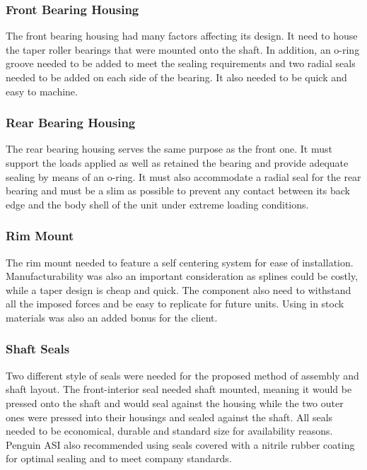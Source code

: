 \subsubsection{Front Bearing Housing}
The front bearing housing had many factors affecting its design. It need to house the taper roller bearings that were mounted onto the shaft. In addition, an o-ring groove needed to be added to meet the sealing requirements and two radial seals needed to be added on each side of the bearing. It also needed to be quick and easy to machine. 

\subsubsection{Rear Bearing Housing}
The rear bearing housing serves the same purpose as the front one. It must support the loads applied as well as retained the bearing and provide adequate sealing by means of an o-ring. It must also accommodate a radial seal for the rear bearing and must be a slim as possible to prevent any contact between its back edge and the body shell of the unit under extreme loading conditions.


\subsubsection{Rim Mount}
The rim mount needed to feature a self centering system for ease of installation. Manufacturability was also an important consideration as splines could be costly, while a taper design is cheap and quick. The component also need to withstand all the imposed forces and be easy to replicate for future units. Using in stock materials was also an added bonus for the client.

\subsubsection{Shaft Seals}
Two different style of seals were needed for the proposed method of assembly and shaft layout. The front-interior seal needed shaft mounted, meaning it would be pressed onto the shaft and would seal against the housing while the two outer ones were pressed into their housings and sealed against the shaft. All seals needed to be economical, durable and standard size for availability reasons. Penguin ASI also recommended using seals covered with a nitrile rubber coating for optimal sealing and to meet company standards.

